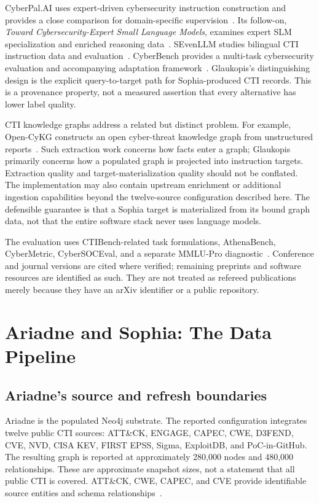 \documentclass[journal]{IEEEtran}
\begin{document}
CyberPal.AI uses expert-driven cybersecurity instruction construction and provides a close comparison for domain-specific supervision~\cite{levi2025cyberpal}. Its follow-on, \emph{Toward Cybersecurity-Expert Small Language Models}, examines expert SLM specialization and enriched reasoning data~\cite{levi2025toward}. SEvenLLM studies bilingual CTI instruction data and evaluation~\cite{ji2024sevenllm}. CyberBench provides a multi-task cybersecurity evaluation and accompanying adaptation framework~\cite{liu2024cyberbench}. Glaukopis's distinguishing design is the explicit query-to-target path for Sophia-produced CTI records. This is a provenance property, not a measured assertion that every alternative has lower label quality.

CTI knowledge graphs address a related but distinct problem. For example, Open-CyKG constructs an open cyber-threat knowledge graph from unstructured reports~\cite{sarhan2021opencykg}. Such extraction work concerns how facts enter a graph; Glaukopis primarily concerns how a populated graph is projected into instruction targets. Extraction quality and target-materialization quality should not be conflated. The implementation may also contain upstream enrichment or additional ingestion capabilities beyond the twelve-source configuration described here. The defensible guarantee is that a Sophia target is materialized from its bound graph data, not that the entire software stack never uses language models.

The evaluation uses CTIBench-related task formulations, AthenaBench, CyberMetric, CyberSOCEval, and a separate MMLU-Pro diagnostic~\cite{alam2024ctibench,alam2025athenabench,tihanyi2024cybermetric,meta2025cybersoceval,wang2024mmlupro}. Conference and journal versions are cited where verified; remaining preprints and software resources are identified as such. They are not treated as refereed publications merely because they have an arXiv identifier or a public repository.

\section{Ariadne and Sophia: The Data Pipeline}\label{sec:data}
\subsection{Ariadne's source and refresh boundaries}
Ariadne is the populated Neo4j substrate. The reported configuration integrates twelve public CTI sources: ATT\&CK, ENGAGE, CAPEC, CWE, D3FEND, CVE, NVD, CISA KEV, FIRST EPSS, Sigma, ExploitDB, and PoC-in-GitHub. The resulting graph is reported at approximately 280,000 nodes and 480,000 relationships. These are approximate snapshot sizes, not a statement that all public CTI is covered. ATT\&CK, CWE, CAPEC, and CVE provide identifiable source entities and schema relationships~\cite{strom2018mitre,mitreCWE,mitreCAPEC,mitreCVE}.
\end{document}
